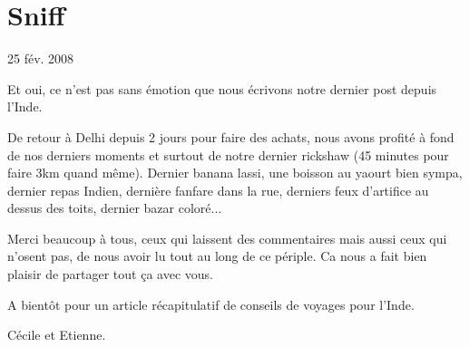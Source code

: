 \section{Sniff}

25 fév. 2008

\begin{multicols}{2}

Et oui, ce n'est pas sans émotion que nous écrivons notre dernier post depuis l'Inde.

De retour à Delhi depuis 2 jours pour faire des achats, nous avons profité à fond de nos derniers moments et surtout de notre dernier rickshaw (45 minutes pour faire 3km quand même). Dernier banana lassi, une boisson au yaourt bien sympa, dernier repas Indien, dernière fanfare dans la rue, derniers feux d'artifice au dessus des toits, dernier bazar coloré...

Merci beaucoup à tous, ceux qui laissent des commentaires mais aussi ceux qui n'osent pas, de nous avoir lu tout au long de ce périple. Ca nous a fait bien plaisir de partager tout ça avec vous.

A bientôt pour un article récapitulatif de conseils de voyages pour l'Inde.

Cécile et Etienne.

\end{multicols}


